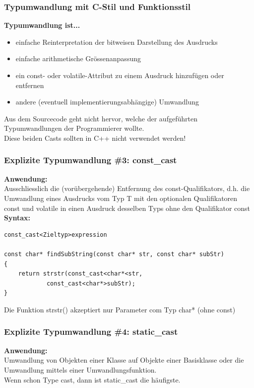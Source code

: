 \subsubsection{Typumwandlung mit C-Stil und Funktionsstil}
\label{sec:Typumwandlung mit C-Stil und Funktionsstil}
\textbf{Typumwandlung ist...}
\begin{itemize}
	\item einfache Reinterpretation der bitweisen Darstellung des Ausdrucks
	\item einfache arithmetische Grössenanpassung
	\item ein const- oder volatile-Attribut zu einem Ausdruck hinzufügen oder entfernen
	\item andere (eventuell implementierungsabhängige) Umwandlung
\end{itemize}
\begin{achtung}
Aus dem Sourcecode geht nicht hervor, welche der aufgeführten Typumwandlungen der Programmierer wollte.\\ 
Diese beiden Casts sollten in C++ nicht verwendet werden!
\end{achtung}

\subsubsection{Explizite Typumwandlung \#3: const\_cast}
\label{sec:Explizite Typumwandlung 3}
\textbf{Anwendung:}\\
Ausschliesslich die (vorübergehende) Entfernung des const-Qualifikators, d.h. die Umwandlung eines Ausdrucks vom Typ T mit den optionalen Qualifikatoren const und volatile in einen Ausdruck desselben Typs ohne den Qualifikator const\\
\textbf{Syntax:}
\noindent
\begin{minipage}{\linewidth}
\begin{lstlisting}
const_cast<Zieltyp>expression

const char* findSubString(const char* str, const char* subStr)
{
	return strstr(const_cast<char*<str,
			const_cast<char*>subStr);
}
\end{lstlisting}
\end{minipage}
Die Funktion strstr() akzeptiert nur Parameter com Typ char* (ohne const)

\subsubsection{Explizite Typumwandlung \#4: static\_cast}
\label{sec:Explizite Typumwandlung 4}
\textbf{Anwendung:}\\
Umwandlung von Objekten einer Klasse auf Objekte einer Basisklasse oder die Umwandlung mittels einer Umwandlungsfunktion.\\
Wenn schon Type cast, dann ist static\_cast die häufigste.

